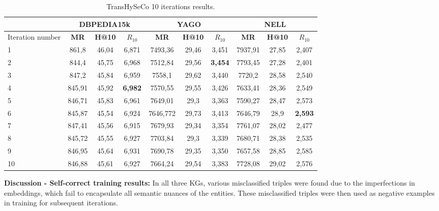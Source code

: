 \documentclass[sigconf]{acmart}
\newcommand{\TransHI}{TransHySeCo\xspace}
\begin{document}
\begin{scriptsize}
\begin{table}[t]
\label{10iter table}
\caption{\TransHI 10 iterations results.}
\begin{small}
\centering 
\begin{tabular}{|l|c|c|c|c|c|c|c|c|c|}
\hline
\multicolumn{1}{|c|}{} & \multicolumn{3}{c|}{\textbf{DBPEDIA15k}} & \multicolumn{3}{c|}{\textbf{YAGO}} & \multicolumn{3}{c|}{\textbf{NELL}} \\
\hline
Iteration number& \textbf{MR} & \textbf{H@10} & \textbf{\( R_{10}\)} & \textbf{MR} & \textbf{H@10} & \textbf{\( R_{10}\)} & \textbf{MR} & \textbf{H@10} & \textbf{\( R_{10}\)} \\
\hline 
1 & 861,8 & 46,04 & 6,871 & 7493,36 & 29,46 & 3,451 & 7937,91 & 27,85 & 2,407 \\
\hline
2 & 844,4 & 45,75 & 6,968 & \cellcolor{gray!25}7512,84 & \cellcolor{gray!25}29,56 & \cellcolor{gray!25}\textbf{3,454} & 7793,45 & 27,28 & 2,401 \\
\hline
3 & 847,2 & 45,84 & 6,959 & 7558,1 & 29,62 & 3,440 & 7720,2 & 28,58 & 2,540 \\
\hline
4 & \cellcolor{gray!25}845,91 & \cellcolor{gray!25}45,92 & \cellcolor{gray!25}\textbf{6,982} & 7570,55 & 29,55 & 3,426 & 7633,41 & 28,36 & 2,549 \\
\hline
5 & 846,71 & 45,83 & 6,961 & 7649,01 & 29,3 & 3,363 & 7590,27 & 28,47 & 2,573 \\
\hline
6 & 845,87 & 45,54 & 6,924 & 7646,772 & 29,73 & 3,413 & \cellcolor{gray!25}7646,79 & \cellcolor{gray!25}28,9 & \cellcolor{gray!25}\textbf{2,593} \\
\hline
7 & 847,41 & 45,56 & 6,915 & 7679,93 & 29,34 & 3,354 & 7761,07 & 28,02 & 2,477 \\
\hline
8 & 845,72 & 45,55 & 6,927 & 7703,84 & 29,3 & 3,339 & 7680,71 & 28,38 & 2,535 \\
\hline
9 & 846,95 & 45,64 & 6,931 & 7690,78 & 29,35 & 3,350 & 7657,58 & 28,85 & 2,585 \\
\hline
10 & 846,88 & 45,61 & 6,927 & 7664,24 & 29,54 & 3,383 & 7728,08 & 29,02 & 2,576 \\
\hline
\end{tabular}
\end{small}
\end{table}
\end{scriptsize}
\noindent\textbf{Discussion - Self-correct training results:} 
In all three KGs, various misclassified triples were found due to the imperfections in embeddings, which fail to encapsulate all semantic nuances of the entities. These misclassified triples were then used as negative examples in training for subsequent iterations.
\end{document}
